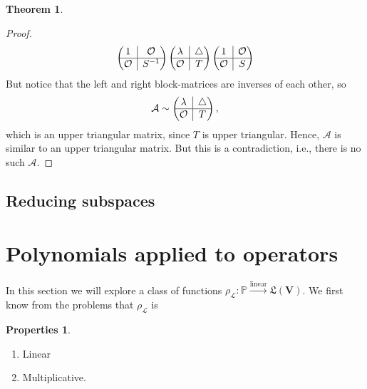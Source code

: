 \documentclass{article}
\theoremstyle{definition}
\newtheorem{prop}{Properties}[section]
\newtheorem{thm}{Theorem}[section]
\newcommand{\V}{\mathbf{V}}
\newcommand{\lag}{\mathcal{L}}
\newcommand{\lin}{\overset{\text{linear}}{\longrightarrow}}
\newcommand{\rvline}{\hspace*{-\arraycolsep}\vline\hspace*{-\arraycolsep}}
\begin{document}
\begin{thm}
\begin{proof}
\begin{align*}
\begin{pmatrix}
		1 & \rvline & \mathcal{O}\\
		\hline
		\mathcal{O} & \rvline & S^{-1}
		\end{pmatrix}
		\begin{pmatrix}
		\lambda & \rvline & \triangle\\
		\hline
		\mathcal{O} & \rvline & T
		\end{pmatrix}
		\begin{pmatrix}
		1 & \rvline & \mathcal{O}\\
		\hline
		\mathcal{O} & \rvline & S
		\end{pmatrix}
		\end{align*}
		But notice that the left and right block-matrices are inverses of each other, so
		\begin{align*}
		\mathcal{A} \sim \begin{pmatrix}
		\lambda & \rvline & \triangle\\
		\hline
		\mathcal{O} & \rvline & T
		\end{pmatrix},
		\end{align*}
		which is an upper triangular matrix, since $T$ is upper triangular. Hence, $\mathcal{A}$ is similar to an upper triangular matrix. But this is a contradiction, i.e., there is no such $\mathcal{A}$. 
	\end{proof}
\end{thm}



\subsection{Reducing subspaces}







\newpage 









\section{Polynomials applied to operators}

In this section we will explore a class of functions $\rho_\lag : \mathbb{P} \lin \mathfrak{L}(\V)$.  We first know from the problems that $\rho_\lag$ is 

\begin{prop}
	$\,$
	\begin{enumerate}
		\item Linear
		\item Multiplicative.
	\end{enumerate}
\end{prop}
\end{document}
